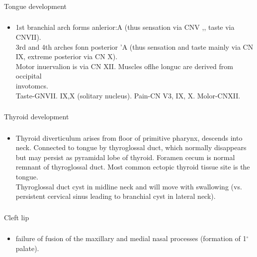 \documentclass[11pt]{beamer}
\begin{document}
\begin{frame}
 \frametitle{}
Tongue development
\end{frame}

\begin{frame}
 \frametitle{}
\begin{itemize}
\item{1st branchial arch forms anlerior:A (thus sensation via CNV ,, taste via CNVII). \\ 3rd and 4th arches fonn posterior 'A (thus sensation and taste mainly via CN IX, extreme posterior via CN X). \\ Motor inuervalion is via CN XII. Muscles oflhe longuc are derived from occipital \\ invotomcs. \\ Taste-GNVII. IX,X (solitary nucleus).
Pain-CN V3, IX, X. Molor-CNXII.}
\end{itemize}
\end{frame}

\begin{frame}
 \frametitle{}
Thyroid development
\end{frame}

\begin{frame}
 \frametitle{}
\begin{itemize}
\item{Thyroid diverticulum arises from floor of primitive pharynx, descends into neck. Connected to tongue by thyroglossal duct, which normally disappears but may persist as pyramidal lobe of thyroid. Foramen cecum is normal remnant of thyroglossal duct. Most common ectopic thyroid tissue site is the tongue. \\ Thyroglossal duct cyst in midline neck and will move with swallowing (vs. persistent cervical sinus leading to branchial cyst in lateral neck).}
\end{itemize}
\end{frame}

\begin{frame}
 \frametitle{}
Cleft lip
\end{frame}

\begin{frame}
 \frametitle{}
\begin{itemize}
\item{failure of fusion of the maxillary and medial nasal processes (formation of 1$^{\circ}$ palate).}
\end{itemize}
\end{frame}
\end{document}

